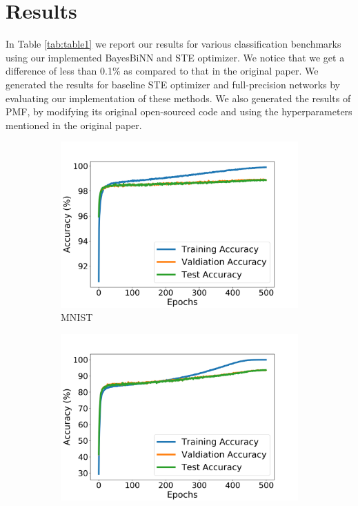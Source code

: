 \section{Results}
In Table \autoref{tab:table1} we report our results for various classification benchmarks using our implemented BayesBiNN and STE optimizer. We notice that we get a difference of less than 0.1\% as compared to that in the original paper. We generated the results for baseline STE optimizer and full-precision networks by evaluating our implementation of these methods. We also generated the results of PMF, by modifying its original open-sourced code and using the hyperparameters mentioned in the original paper.

\begin{figure}[h]
     \centering
     \begin{subfigure}[b]{0.3\textwidth}
         \centering
         \includegraphics[width=1.2\textwidth]{../openreview/figs/MNIST.png}
         \caption{MNIST}
     \end{subfigure}
     \hfill
     \begin{subfigure}[b]{0.3\textwidth}
         \centering
         \includegraphics[width=1.2\textwidth]{../openreview/figs/CIFAR10.png}

\end{subfigure}
\end{figure}
